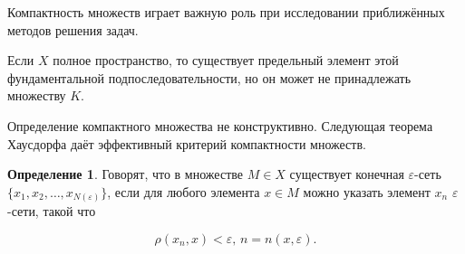 \documentclass[12pt,a4paper,titlepage,oneside]{book}
\theoremstyle{definition}
\newtheorem*{definition}{Определение}
\theoremstyle{plain}
\theoremstyle{remark}
\theoremstyle{remark}
\theoremstyle{remark}
\theoremstyle{remark}
\theoremstyle{plain}
\theoremstyle{plain}
\begin{document}
Компактность множеств играет важную роль при исследовании приближённых методов решения задач.

Если $X$ полное пространство, то существует предельный элемент этой фундаментальной подпоследовательности, но он может не принадлежать множеству $K$.

Определение компактного множества не конструктивно. Следующая теорема Хаусдорфа даёт эффективный критерий компактности множеств.

\begin{definition}
Говорят, что в множестве $M \in X$ существует конечная $\varepsilon$-сеть $\lbrace x_1,x_2,\ldots,x_{N(\varepsilon)} \rbrace$, если для любого элемента $x \in M$ можно указать элемент $x_n$ $\varepsilon$-сети, такой что

$$
\rho(x_n, x) < \varepsilon \mbox{, } n=n(x,\varepsilon).
$$

\end{definition}
\end{document}
